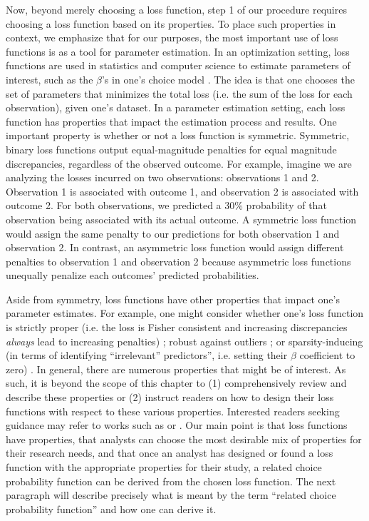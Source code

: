 Now, beyond merely choosing a loss function, step 1 of our procedure requires choosing a loss function based on its properties. To place such properties in context, we emphasize that for our purposes, the most important use of loss functions is as a tool for parameter estimation. In an optimization setting, loss functions are used in statistics and computer science to estimate parameters of interest, such as the $\beta$'s in one's choice model \citep{gneiting_strictly_2007, dawid_geometry_2006}. The idea is that one chooses the set of parameters that minimizes the total loss (i.e. the sum of the loss for each observation), given one's dataset. In a parameter estimation setting, each loss function has properties that impact the estimation process and results. One important property is whether or not a loss function is symmetric. Symmetric, binary loss functions output equal-magnitude penalties for equal magnitude discrepancies, regardless of the observed outcome. For example, imagine we are analyzing the losses incurred on two observations: observations 1 and 2. Observation 1 is associated with outcome 1, and observation 2 is associated with outcome 2. For both observations, we predicted a 30\% probability of that observation being associated with its actual outcome. A symmetric loss function would assign the same penalty to our predictions for both observation 1 and observation 2. In contrast, an asymmetric loss function would assign different penalties to observation 1 and observation 2 because asymmetric loss functions unequally penalize each outcomes' predicted probabilities.

Aside from symmetry, loss functions have other properties that impact one's parameter estimates. For example, one might consider whether one's loss function is strictly proper (i.e. the loss is Fisher consistent and increasing discrepancies \textit{always} lead to increasing penalties) \citep{buja_loss_2005, reid_composite_2010}; robust against outliers \citep{pregibon_resistant_1982, carroll_robustness_1993, bianco_robust_1996}; or sparsity-inducing (in terms of identifying ``irrelevant'' predictors'', i.e. setting their $\beta$ coefficient to zero) \citep{kyung_penalized_2010, bach_optimization_2012, xu_sparse_2012}. In general, there are numerous properties that might be of interest. As such, it is beyond the scope of this chapter to (1) comprehensively review and describe these properties or (2) instruct readers on how to design their loss functions with respect to these various properties. Interested readers seeking guidance may refer to works such as \citet{hennig_thoughts_2007} or \citet{merkle_choosing_2013}. Our main point is that loss functions have properties, that analysts can choose the most desirable mix of properties for their research needs, and that once an analyst has designed or found a loss function with the appropriate properties for their study, a related choice probability function can be derived from the chosen loss function. The next paragraph will describe precisely what is meant by the term ``related choice probability function'' and how one can derive it.

